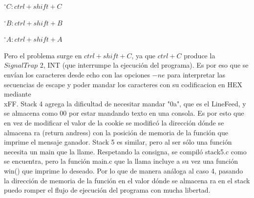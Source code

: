 \documentclass[a4paper,10pt]{article}
\begin{document}
   $^{\circ}C: ctrl+shift+C$
   
   $^{\circ}B: ctrl+shift+B$
   
   $^{\circ}A: ctrl+shift+A$
   
   Pero el problema surge en $ctrl+shift+C$, ya que $ctrl+C$ produce la $SignalTrap$ 2, INT (que interrumpe la ejecución del programa). \newline
   Es por eso que se envían los caracteres desde echo con las opciones $-ne$ para interpretar las secuencias de escape y poder mandar los caracteres con su codificacion en HEX mediante \\xFF.
  \newline Stack 4 agrega la dificultad de necesitar mandar "0a", que es el LineFeed, y se almacena como 00 por estar mandando texto en una consola. Es por esto que en vez de modificar el valor de la cookie se modificó la dirección dónde se almacena ra (return andress) con la posición de memoria de la función que imprime el mensaje ganador.
   \newline Stack 5 es similar, pero al ser sólo una función necesita un main que la llame. Respetando la consigna, se compiló stack5.c como se encuentra, pero la función main.c que la llama incluye a su vez una función win() que imprime lo deseado. Por lo que de manera análoga al caso 4, pasando la dirección de memoria de la función en el valor dónde se almacena ra en el stack puedo romper el flujo de ejecución del programa con mucha libertad.
   
\end{document}

